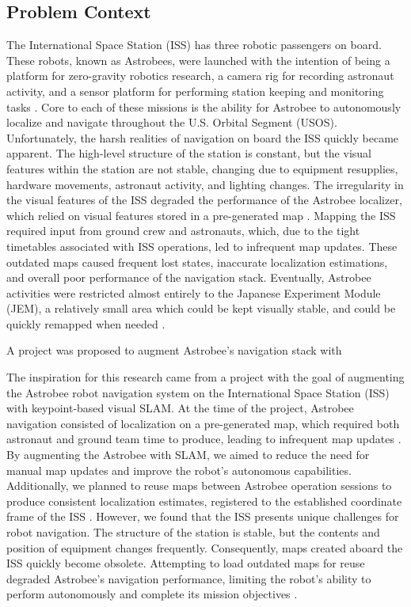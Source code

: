 \subsection{Problem Context}


The International Space Station (ISS) has three robotic passengers on board. These robots, known as Astrobees, were launched with the intention of being a platform for zero-gravity robotics research, a camera rig for recording astronaut activity, and a sensor platform for performing station keeping and monitoring tasks \cite{smithASTROBEENEWPLATFORM}. Core to each of these missions is the ability for Astrobee to autonomously localize and navigate throughout the U.S. Orbital Segment (USOS). Unfortunately, the harsh realities of navigation on board the ISS quickly became apparent. The high-level structure of the station is constant, but the visual features within the station are not stable, changing due to equipment resupplies, hardware movements, astronaut activity, and lighting changes. The irregularity in the visual features of the ISS degraded the performance of the Astrobee localizer, which relied on visual features stored in a pre-generated map \cite{soussanAstroLocEfficientRobust2022}. Mapping the ISS required input from ground crew and astronauts, which, due to the tight timetables associated with ISS operations, led to infrequent map updates. These outdated maps caused frequent lost states, inaccurate localization estimations, and overall poor performance of the navigation stack. Eventually, Astrobee activities were restricted almost entirely to the Japanese Experiment Module (JEM), a relatively small area which could be kept visually stable, and could be quickly remapped when needed \cite{carlinoLessonsLearnedAstrobee}.

A project was proposed to augment Astrobee's navigation stack with 

The inspiration for this research came from a project with the goal of augmenting the Astrobee robot navigation system on the International Space Station (ISS) with keypoint-based visual SLAM. At the time of the project, Astrobee navigation consisted of localization on a pre-generated map, which required both astronaut and ground team time to produce, leading to infrequent map updates \cite{soussanAstroLocEfficientRobust2022}. By augmenting the Astrobee with SLAM, we aimed to reduce the need for manual map updates and improve the robot's autonomous capabilities. Additionally, we planned to reuse maps between Astrobee operation sessions to produce consistent localization estimates, registered to the established coordinate frame of the ISS \cite{zuralesCollaborativeSensingMapping2024}. However, we found that the ISS presents unique challenges for robot navigation. The structure of the station is stable, but the contents and position of equipment changes frequently. Consequently, maps created aboard the ISS quickly become obsolete. Attempting to load outdated maps for reuse degraded Astrobee's navigation performance, limiting the robot's ability to perform autonomously and complete its mission objectives \cite{carlinoLessonsLearnedAstrobee}.

